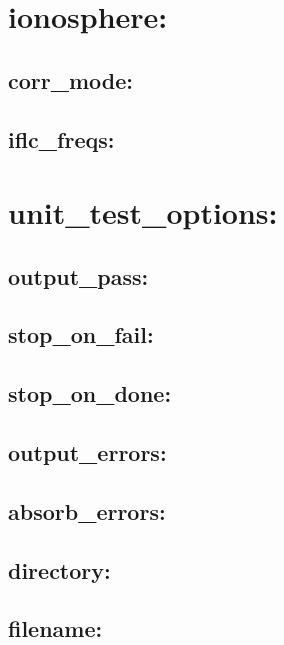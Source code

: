 \section{ionosphere:}

\subsection{corr\_mode:}

\subsection{iflc\_freqs:}





\section{unit\_test\_options:}

\subsection{output\_pass:}

\subsection{stop\_on\_fail:}

\subsection{stop\_on\_done:}

\subsection{output\_errors:}

\subsection{absorb\_errors:}

\subsection{directory:}

\subsection{filename:}






